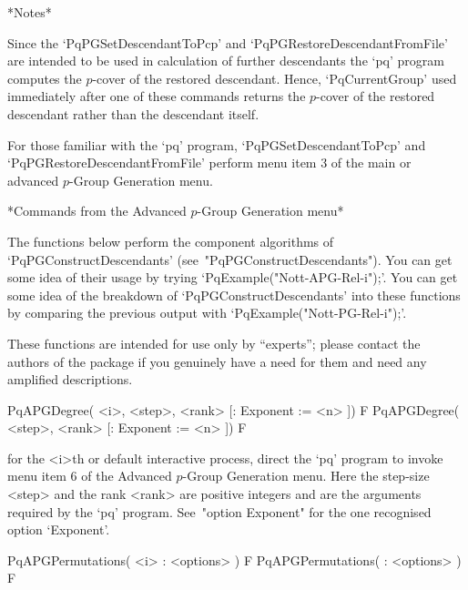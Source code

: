 *Notes*

Since the  `PqPGSetDescendantToPcp'  and  `PqPGRestoreDescendantFromFile'
are intended to be used in calculation of further  descendants  the  `pq'
program computes  the  $p$-cover  of  the  restored  descendant.   Hence,
`PqCurrentGroup' used immediately after one of these commands returns the
$p$-cover of the restored descendant rather than the descendant itself.

For those familiar with the `pq'  program,  `PqPGSetDescendantToPcp'  and
`PqPGRestoreDescendantFromFile' perform  menu  item  3  of  the  main  or
advanced $p$-Group Generation menu.

\goodbreak%
*Commands from the Advanced $p$-Group Generation menu*

The   functions   below   perform    the    component    algorithms    of
`PqPGConstructDescendants' (see~"PqPGConstructDescendants"). You can  get
some idea of their usage by  trying  `PqExample("Nott-APG-Rel-i");'.  You
can get some idea of the  breakdown  of  `PqPGConstructDescendants'  into
these   functions    by    comparing    the    previous    output    with
`PqExample("Nott-PG-Rel-i");'. 

These functions are intended for  use only by ``experts''; please contact
the authors of the package if you genuinely have a need for them and need
any amplified descriptions.

\>PqAPGDegree( <i>, <step>, <rank> [: Exponent := <n> ]) F
\>PqAPGDegree( <step>, <rank> [: Exponent := <n> ]) F


for the  <i>th or default  interactive {\ANUPQ} process, direct  the `pq'
program to invoke menu item  6 of the Advanced $p$-Group Generation menu.
Here the step-size  <step> and the rank <rank>  are positive integers and
are the  arguments required by  the `pq' program.   See~"option Exponent"
for the one recognised option `Exponent'.


\>PqAPGPermutations( <i> : <options> ) F
\>PqAPGPermutations( : <options> ) F


